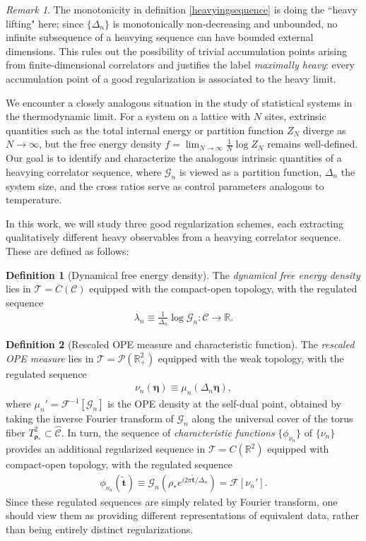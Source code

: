\documentclass[a4paper,11pt]{article}
\theoremstyle{plain}
\theoremstyle{definition}
\newtheorem{defn}{Definition}[section]
\theoremstyle{remark}
\newtheorem*{rem}{Remark}
\newcommand{\bs}[1]{\boldsymbol{#1}}
\newcommand{\ba}{\begin{equation} \begin{aligned}}
\newcommand{\ea}{\end{aligned} \end{equation}}
\newcommand{\De}{\Delta}
\begin{document}
\begin{rem}
The monotonicity in definition \ref{heavyingsequence} is doing the ``heavy lifting" here; since $\{\De_n\}$ is monotonically non-decreasing and unbounded, no infinite subsequence of a heavying sequence can have bounded external dimensions. This rules out the possibility of trivial accumulation points arising from finite-dimensional correlators and justifies the label \textit{maximally heavy}: every accumulation point of a good regularization is associated to the heavy limit.
\end{rem}
We encounter a closely analogous situation in the study of statistical systems in the thermodynamic limit. For a system on a lattice with $N$ sites, extrinsic quantities such as the total internal energy or partition function $Z_N$ diverge as $N\to\infty$, but the free energy density $f = \lim_{N\to\infty} \frac{1}{N}\log Z_N$ remains well-defined. Our goal is to identify and characterize the analogous intrinsic quantities of a heavying correlator sequence, where $\mathcal{G}_n$ is viewed as a partition function, $\De_n$ the system size, and the cross ratios serve as control parameters analogous to temperature. 
 
In this work, we will study three good regularization schemes, each extracting qualitatively different heavy observables from a heavying correlator sequence. These are defined as follows:
 
\begin{defn}[Dynamical free energy density]
\label{def:ratefn}
The \textit{dynamical free energy density} lies in $\mathcal{T} = C(\mathscr{C})$ equipped with the compact-open topology, with the regulated sequence
\ba
 \lambda_n \equiv  \frac{1}{\De_n} \log \mathcal{G}_n : \mathscr{C} \to \mathbb{R}.
\ea
\end{defn}
 
\begin{defn}[Rescaled OPE measure and characteristic function]
\label{def:rescaledmeasure}
The \textit{rescaled OPE measure} lies in $\mathcal{T} = \mathcal{P}(\mathbb{R}^2_+)$ equipped with the weak topology, with the regulated sequence
\ba
\nu_n(\bs{\eta}) \equiv \mu_n(\De_n \bs{\eta}),
\ea
where $\mu_n' = \mathcal{F}^{-1}[\mathcal{G}_n]$ is the OPE density at the self-dual point, obtained by taking the inverse Fourier transform of $\mathcal{G}_n$ along the universal cover of the torus fiber $T^2_{\bs{\rho}_*} \subset \widehat{\mathscr{C}}$. In turn, the sequence of \textit{characteristic functions} $\{\phi_{\nu_n}\}$ of $\{\nu_n\}$ provides an additional regularized sequence in $\mathcal{T} = C(\mathbb{R}^2)$ equipped with compact-open topology, with the regulated sequence 
\ba
\phi_{\nu_n}(\tilde{\bs{t}}) \equiv \mathcal{G}_n(\rho_* e^{i2\pi \tilde{\bs{t}}/\De_n })  = \mathcal{F}[\nu_n' ].
\ea 
Since these regulated sequences are simply related by Fourier transform, one should view them as providing different representations of equivalent data, rather than being entirely distinct regularizations.
\end{defn}
 
\end{document}
